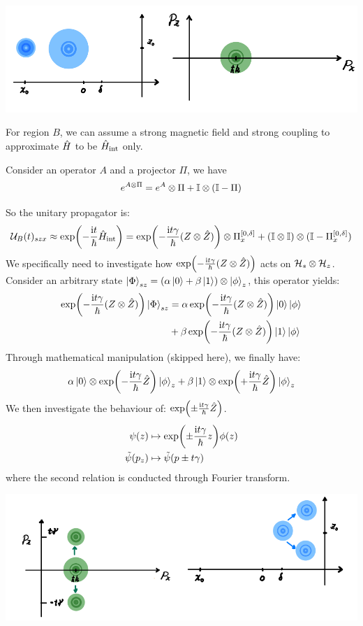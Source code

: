 \begin{center}
    \includegraphics[scale = 0.8]{stern-gerlach-nonint.png}
\end{center}
For region $B$, we can assume a strong magnetic field and strong coupling to approximate $\hat{H}$ to be $\hat{H}_{\text{int}}$ only.
\begin{lemma}
    Consider an operator $A$ and a projector $\Pi$, we have
    $$e^{A \otimes \Pi} = e^A \otimes \Pi + \mathbb{I} \otimes (\mathbb{I} - \Pi)$$
\end{lemma}
So the unitary propagator is:
$$\mathcal{U}_B(t)_{szx} \approx \exp(-\frac{\mathrm{i} t}{\hbar} \hat{H}_{\text{int}}) = \exp(-\frac{\mathrm{i} t \gamma}{\hbar}(Z \otimes \hat{Z})) \otimes \Pi_{x}^{[0, \delta]} + (\mathbb{I} \otimes \mathbb{I}) \otimes (\mathbb{I} - \Pi_{x}^{[0, \delta]})$$
We specifically need to investigate how $\exp(-\frac{\mathrm{i} t \gamma}{\hbar}(Z \otimes \hat{Z}))$ acts on $\mathcal{H}_s \otimes \mathcal{H}_z$. Consider an arbitrary state $\ket{\Phi}_{sz} = (\alpha \ket{0} + \beta \ket{1}) \otimes \ket{\phi}_z$, this operator yields:
\begin{align*}
    \exp(-\frac{\mathrm{i} t \gamma}{\hbar}(Z \otimes \hat{Z})) \ket{\Phi}_{sz} &= \alpha\exp(-\frac{\mathrm{i} t \gamma}{\hbar}(Z \otimes \hat{Z})) \ket{0}\ket{\phi} \\
    &+ \beta\exp(-\frac{\mathrm{i} t \gamma}{\hbar}(Z \otimes \hat{Z})) \ket{1}\ket{\phi}
\end{align*}
Through mathematical manipulation (skipped here), we finally have:
$$\alpha \ket{0} \otimes \exp(-\frac{\mathrm{i} t \gamma}{\hbar}\hat{Z})\ket{\phi}_z + \beta \ket{1} \otimes \exp(+\frac{\mathrm{i} t \gamma}{\hbar}\hat{Z})\ket{\phi}_z$$
We then investigate the behaviour of: $\exp(\pm\frac{\mathrm{i} t \gamma}{\hbar}\hat{Z})$.
\begin{align*}
    \psi(z) &\mapsto \exp(\pm \frac{\mathrm{i} t \gamma}{\hbar}z)\phi(z) \\
    \tilde{\psi}(p_z) &\mapsto \tilde{\psi}(p \pm t\gamma)
\end{align*}
where the second relation is conducted through Fourier transform.
\begin{center}
    \includegraphics[scale = 1]{stern-gerlach-int.png}
\end{center}

